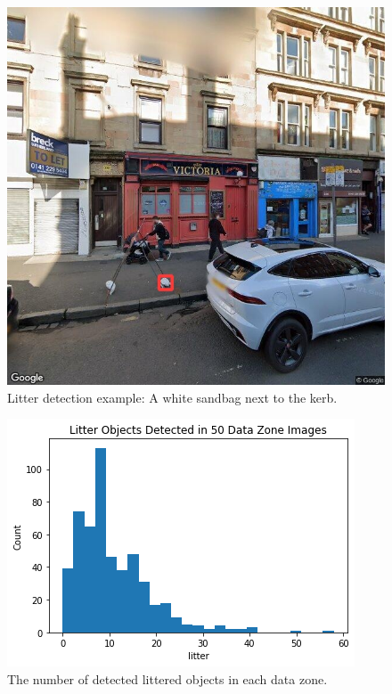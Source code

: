 \documentclass{thesis}
\begin{document}
\begin{figure}[h!]
    \centering
    \includegraphics[scale=0.45]{images/flaw-sandbag.jpg}
    \caption{Litter detection example: A white sandbag next to the kerb.}
    \label{fig:sandbag}
\end{figure}
\newpage

\begin{figure}[h!]
    \centering
    \includegraphics[scale=0.6]{images/litter-hist.png}
    \caption{The number of detected littered objects in each data zone.}
    \label{fig:litter-histogram}
\end{figure}
\end{document}
